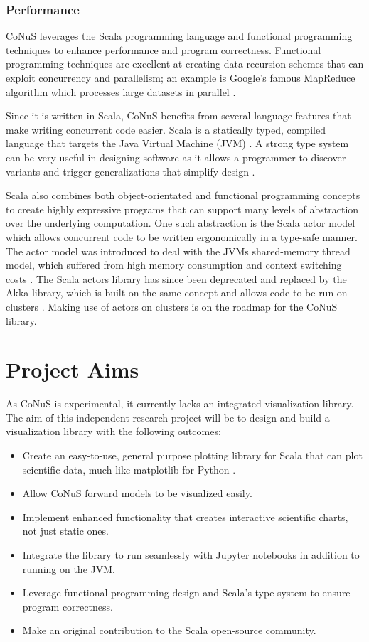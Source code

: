 \documentclass[12pt]{article}
\begin{document}
	\subsubsection{Performance}
	CoNuS leverages the Scala programming language and functional programming techniques to enhance performance and program correctness. Functional programming techniques are excellent at creating data recursion schemes that can exploit concurrency and parallelism; an example is Google's famous MapReduce algorithm which processes large datasets in parallel \autocite{LAMMEL20081}. 
	
	Since it is written in Scala, CoNuS benefits from several language features that make writing concurrent code easier. Scala is a statically typed, compiled language that targets the Java Virtual Machine (JVM) \autocite{scala}. A strong type system can be very useful in designing software as it allows a programmer to discover variants and trigger generalizations that simplify design \autocite{LAMMEL20081}. 
	
	Scala also combines both object-orientated and functional programming concepts to create highly expressive programs that can support many levels of abstraction over the underlying computation. One such abstraction is the Scala actor model which allows concurrent code to be written ergonomically in a type-safe manner. The actor model was introduced to deal with the JVMs shared-memory thread model, which suffered from high memory consumption and context switching costs \autocite{haller_odersky_2009}. The Scala actors library has since been deprecated and replaced by the Akka library, which is built on the same concept and allows code to be run on clusters \autocite{akka}. Making use of actors on clusters is on the roadmap for the CoNuS library.
	
	\section{Project Aims}
	As CoNuS is experimental, it currently lacks an integrated visualization library. The aim of this independent research project will be to design and build a visualization library with the following outcomes:
	
	\begin{itemize}
		\item Create an easy-to-use, general purpose plotting library for Scala that can plot scientific data, much like matplotlib for Python \autocite{matplotlib}.
		\item Allow CoNuS forward models to be visualized easily.
		\item Implement enhanced functionality that creates interactive scientific charts, not just static ones. 
		\item Integrate the library to run seamlessly with Jupyter notebooks in addition to running on the JVM.
		\item Leverage functional programming design and Scala's type system to ensure program correctness.
		\item Make an original contribution to the Scala open-source community.
	\end{itemize}
	
\end{document}
